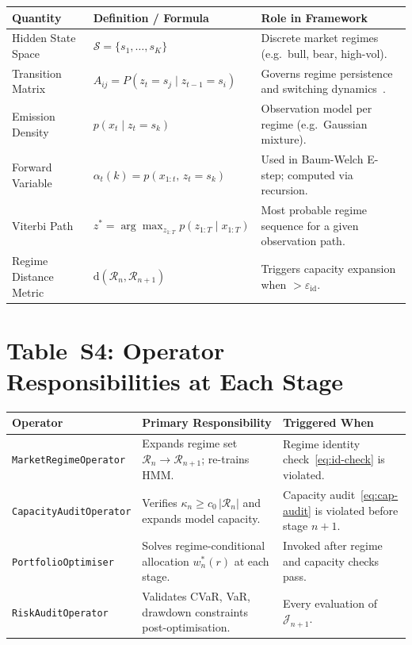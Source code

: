 \documentclass[12pt,openany]{book}
\numberwithin{equation}{chapter}
\theoremstyle{plain}
\theoremstyle{definition}
\theoremstyle{remark}
\numberwithin{equation}{chapter}
\theoremstyle{plain}
\begin{document}
\begin{center}
\begin{tabularx}{\textwidth}{@{} l X X @{}}
\hline
\textbf{Quantity} & \textbf{Definition / Formula} & \textbf{Role in Framework} \\
\hline
Hidden State Space &
  $\mathcal{S} = \{s_1,\dots,s_K\}$ &
  Discrete market regimes (e.g.\ bull, bear, high-vol). \\
\addlinespace
Transition Matrix &
  $A_{ij} = P(z_t = s_j \mid z_{t-1} = s_i)$ &
  Governs regime persistence and switching dynamics~\cite{R6}. \\
\addlinespace
Emission Density &
  $p(x_t \mid z_t = s_k)$ &
  Observation model per regime (e.g.\ Gaussian mixture). \\
\addlinespace
Forward Variable &
  $\alpha_t(k) = p(x_{1:t},\, z_t=s_k)$ &
  Used in Baum-Welch E-step; computed via recursion. \\
\addlinespace
Viterbi Path &
  $z^* = \arg\max_{z_{1:T}} p(z_{1:T}\mid x_{1:T})$ &
  Most probable regime sequence for a given observation path. \\
\addlinespace
Regime Distance Metric &
  $\mathrm{d}(\mathcal{R}_n,\mathcal{R}_{n+1})$ &
  Triggers capacity expansion when $> \varepsilon_{\mathrm{id}}$. \\
\hline
\end{tabularx}
\end{center}

\section*{Table~S4: Operator Responsibilities at Each Stage}

\begin{center}
\begin{tabularx}{\textwidth}{@{} l X X @{}}
\hline
\textbf{Operator} & \textbf{Primary Responsibility} & \textbf{Triggered When} \\
\hline
\texttt{MarketRegimeOperator} &
  Expands regime set $\mathcal{R}_n \to \mathcal{R}_{n+1}$; re-trains HMM. &
  Regime identity check~\eqref{eq:id-check} is violated. \\
\addlinespace
\texttt{CapacityAuditOperator} &
  Verifies $\kappa_n \ge c_0\,|\mathcal{R}_n|$ and expands model capacity. &
  Capacity audit~\eqref{eq:cap-audit} is violated before stage $n{+}1$. \\
\addlinespace
\texttt{PortfolioOptimiser} &
  Solves regime-conditional allocation $w_n^*(r)$ at each stage. &
  Invoked after regime and capacity checks pass. \\
\addlinespace
\texttt{RiskAuditOperator} &
  Validates CVaR, VaR, drawdown constraints post-optimisation. &
  Every evaluation of $\mathcal{J}_{n+1}$. \\
\hline
\end{tabularx}
\end{center}
\end{document}
